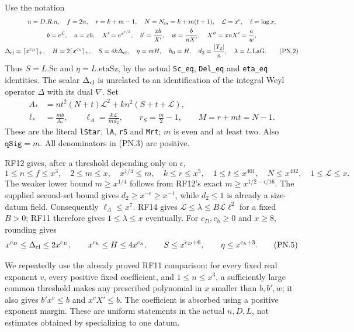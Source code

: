 Use the notation
\begin{gather*}
 n=D.R.n,\quad f=2n,\quad r=k+m-1,\quad
 N=N_m=k+m(t+1),\quad \mathcal L=x^\epsilon,\quad\ell=\log x,\\
 b=e^{\mathcal L},\quad a=xb,\quad X'=e^{x^{\epsilon/3}},\quad
 b'=\frac{xb}{X'},\quad w=\frac{b}{nX'},\quad X''=xnX'=\frac{a}{w},\\
 \Delta_{\rm cl}=\lceil x^{c_D}\rceil_+,\quad
 H=2\lceil x^{c_h}\rceil_+,\quad
 S=4k\Delta_{\rm cl},\quad\eta=mH,\quad h_0=H,\quad
 d_2=\frac{|T_2|}{n},\quad\lambda=L.\mathrm{LaG}.
                                                               \tag{PN.2}
\end{gather*}
Thus $S=L.\mathrm{Sc}$ and $\eta=L.\mathrm{etaSz}$, by the actual
\texttt{Sc\_eq}, \texttt{Del\_eq} and \texttt{eta\_eq} identities.
The scalar $\Delta_{\rm cl}$ is unrelated to an identification of the
integral Weyl operator $\Delta$ with its dual $\nabla$.
Set
\begin{align*}
 A_*&=nt^2(N+t)\mathcal L^2+kn^2(S+t+\mathcal L),\\
 \ell_*&=\frac{mb}{A_*},\qquad
 \ell_A=\frac{k\mathcal L}{md_2},\qquad
 r_S=\frac m2-1,\qquad M=r+mt=N-1.
                                                               \tag{PN.3}
\end{align*}
These are the literal \texttt{lStar}, \texttt{lA}, \texttt{rS} and
\texttt{Mrt}; $m$ is even and at least two. Also
$\texttt{qSig}=m$. All denominators in (PN.3) are positive.

RF12 gives, after a threshold depending only on $\epsilon$,
\[
 1\leq n\leq f\leq x^3,\quad
 2\leq m\leq x,\quad x^{1/4}\leq m,\quad
 k\leq r\leq x^5,\quad
 1\leq t\leq x^{401},\quad N\leq x^{402},\quad
 1\leq\mathcal L\leq x.                                    \tag{PN.4}
\]
The weaker lower bound $m\geq x^{1/4}$ follows from RF12's exact
$m\geq x^{1/2-\epsilon/16}$. The supplied second-set bound gives
$d_2\geq x^{-\epsilon}\geq x^{-1}$, while $d_2\leq1$ is already a
size-datum field. Consequently $\ell_A\leq x^7$. RF14 gives
$\mathcal L\leq\lambda\leq B\mathcal L\ell^2$ for a fixed $B>0$;
RF11 therefore gives $1\leq\lambda\leq x$ eventually.
For $c_D,c_h\geq0$ and $x\geq8$, rounding gives
\[
 x^{c_D}\leq\Delta_{\rm cl}\leq2x^{c_D},\qquad
 x^{c_h}\leq H\leq4x^{c_h},\qquad
 S\leq x^{c_D+6},\qquad \eta\leq x^{c_h+3}.             \tag{PN.5}
\]

We repeatedly use the already proved RF11 comparison: for every fixed
real exponent $v$, every positive fixed coefficient, and
$1\leq n\leq x^3$, a sufficiently large common threshold makes any
prescribed polynomial in $x$ smaller than $b,b',w$; it also gives
$b'x^v\leq b$ and $x^vX'\leq b$. The coefficient is absorbed using a
positive exponent margin. These are uniform statements in the actual
$n,D,L$, not estimates obtained by specializing to one datum.

